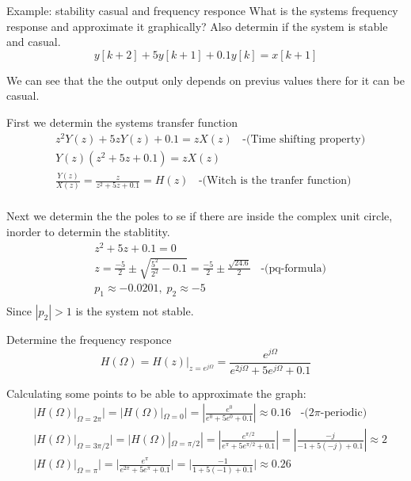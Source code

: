 \begin{exampleblock}{Example: stability casual and frequency responce} %
    What is the systems frequency response and approximate it graphically? Also determin if the system is 
    stable and casual. 
    \begin{equation*}
        y[k+2]+5y[k+1]+0.1y[k] = x[k+1]
    \end{equation*}

    We can see that the the output only depends on previus values there for 
    it can be casual.

    First we determin the systems transfer function
    \begin{align*}
        &z^2Y(z)+5zY(z)+0.1 = zX(z) \;\; \text{ -(Time shifting property)} \\
        &Y(z)(z^2+5z+0.1) = zX(z) \\
        &\frac{Y(z)}{X(z)} = \frac{z}{z^2+5z+0.1} = H(z) \;\; \text{ -(Witch is the tranfer function)} \\
    \end{align*}

    Next we determin the the poles to se if there are inside the complex unit circle, 
    inorder to determin the stablitity.
    \begin{align*}
        &z^2+5z+0.1 = 0 \\
        &z=\frac{-5}{2}\pm\sqrt{\frac{5^2}{2^2}-0.1}=\frac{-5}{2}\pm\frac{\sqrt{24.6}}{2} \;\; \text{ -(pq-formula)}\\
        &p_1\approx-0.0201, \; p_2\approx-5 \\ 
    \end{align*}
    Since $|p_2|>1$ is the system not stable.

    Determine the frequency responce
    \begin{equation*}
        H(\Omega) = H(z)|_{z=e^{j\Omega}} = \frac{e^{j\Omega}}{e^{2j\Omega} + 5e^{j\Omega} + 0.1}
    \end{equation*}

    Calculating some points to be able to approximate the graph:
    \begin{align*}
        &|H(\Omega)|_{\Omega=2\pi}| = |H(\Omega)|_{\Omega=0}| = |\frac{e^0}{e^0+5e^0+0.1}| \approx 0.16 \;\; \text{ -($2\pi$-periodic)}\\
        &|H(\Omega)|_{\Omega=3\pi/2}| = |H(\Omega)|_{\Omega=\pi/2}| = |\frac{e^{\pi/2}}{e^{\pi}+5e^{\pi/2}+0.1}| = |\frac{-j}{-1+5(-j)+0.1}| \approx 2 \\
        &|H(\Omega)|_{\Omega=\pi}| = |\frac{e^{\pi}}{e^{2\pi}+5e^{\pi}+0.1}| = |\frac{-1}{1+5(-1)+0.1}| \approx 0.26 \\
    \end{align*}

\end{exampleblock}

